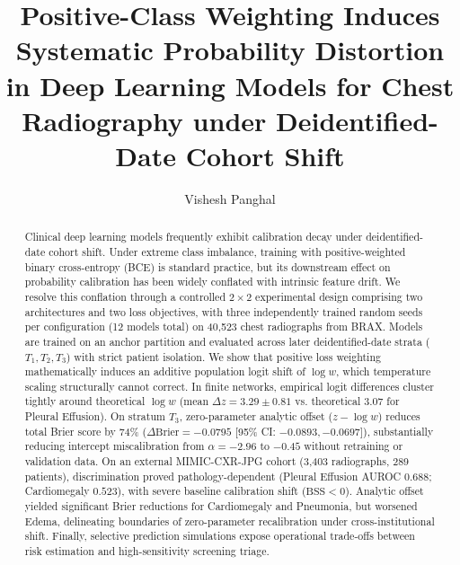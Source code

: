 \documentclass[preprint,12pt]{elsarticle}
\begin{document}
\begin{frontmatter}

\title{Positive-Class Weighting Induces Systematic Probability Distortion in Deep Learning Models for Chest Radiography under Deidentified-Date Cohort Shift}

\author{Vishesh Panghal}


\begin{abstract}
Clinical deep learning models frequently exhibit calibration decay under deidentified-date cohort shift. Under extreme class imbalance, training with positive-weighted binary cross-entropy (BCE) is standard practice, but its downstream effect on probability calibration has been widely conflated with intrinsic feature drift. We resolve this conflation through a controlled $2 \times 2$ experimental design comprising two architectures and two loss objectives, with three independently trained random seeds per configuration (12 models total) on 40,523 chest radiographs from BRAX. Models are trained on an anchor partition and evaluated across later deidentified-date strata ($T_1, T_2, T_3$) with strict patient isolation. We show that positive loss weighting mathematically induces an additive population logit shift of $\log w$, which temperature scaling structurally cannot correct. In finite networks, empirical logit differences cluster tightly around theoretical $\log w$ (mean $\Delta z = 3.29 \pm 0.81$ vs. theoretical $3.07$ for Pleural Effusion). On stratum $T_3$, zero-parameter analytic offset ($z - \log w$) reduces total Brier score by 74\% ($\Delta\text{Brier} = -0.0795$ [95\% CI: $-0.0893, -0.0697$]), substantially reducing intercept miscalibration from $\alpha = -2.96$ to $-0.45$ without retraining or validation data. On an external MIMIC-CXR-JPG cohort (3,403 radiographs, 289 patients), discrimination proved pathology-dependent (Pleural Effusion AUROC $0.688$; Cardiomegaly $0.523$), with severe baseline calibration shift ($\text{BSS} < 0$). Analytic offset yielded significant Brier reductions for Cardiomegaly and Pneumonia, but worsened Edema, delineating boundaries of zero-parameter recalibration under cross-institutional shift. Finally, selective prediction simulations expose operational trade-offs between risk estimation and high-sensitivity screening triage.
\end{abstract}


\end{frontmatter}
\end{document}
